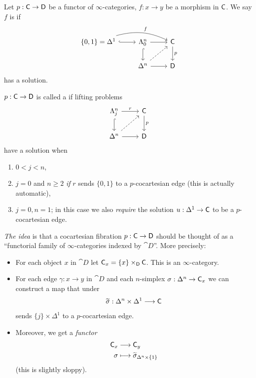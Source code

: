 \begin{definition}
	Let $p:\C\to \cat{D}$ be a functor of $\infty$-categories, $f:x\to y$ be a morphism in
	$\mathsf{C}$.  We say $f$ is  if
	\[
		\begin{tikzcd}
			\{0,1\} = \Delta^{1} \ar[r,hook] \ar[rr,bend left=20, "f"] & \Lambda_0^{n} \ar[r]
			\ar[d, hook] & \C \ar[d,"p"] \\
			& \Delta^{n} \ar[r] \ar[ur,dashed] & \cat{D}
		\end{tikzcd}
	\]
	has a solution.
\end{definition}
\begin{definition}
	$p:\C\to \cat{D}$ is called a  if lifting problems
	\[
		\begin{tikzcd}
			\Lambda_j^{n} \ar[r,"r"] \ar[d,hook] & \C \ar[d,"p"] \\
			\Delta^{n} \ar[r] \ar[ur,dashed] & \cat{D}
		\end{tikzcd}
	\]
	have a solution when
	\begin{enumerate}[(1)]
		\item $0<j<n$,
		\item $j=0$ and $n\ge 2$ \emph{if} $r$ sends $\{0,1\} $ to a $p$-cocartesian edge (this
			is actually automatic),
		\item $j=0,n=1$; in this case we also \emph{require} the solution $u:\Delta^{1}\to \C$
			to be a $p$-cocartesian edge.
	\end{enumerate}
\end{definition}
\emph{The idea} is that a cocartesian fibration $p:\C\to \cat{D}$ should be thought of as
a ``functorial family of $\infty$-categories indexed by $\cat{D}$''. More precisely:
\begin{itemize}
	\item For each object $x$ in $\cat{D}$ let $\mathsf{C}_x = \{x\}\times_{\mathsf{D}}\mathsf{C}$. This is an
		$\infty$-category.
	\item For each edge $\gamma:x\to y$ in $\cat{D}$ and each $n$-simplex
		$\sigma:\Delta^{n}\to \C_x$ we can construct a map that under
		\[
			\wt{\sigma}: \Delta^{n}\times \Delta^{1} \to \C
		\]
		sends $\{j\} \times \Delta^{1}$ to a $p$-cocartesian edge.
	\item Moreover, we get a \emph{functor}
		\begin{align*}
			\mathsf{C}_x &\longrightarrow \mathsf{C}_y \\
			\sigma &\longmapsto \widetilde{\sigma}_{\Delta^{n}\times \{1\} }
		\end{align*}
		(this is slightly sloppy).
\end{itemize}
